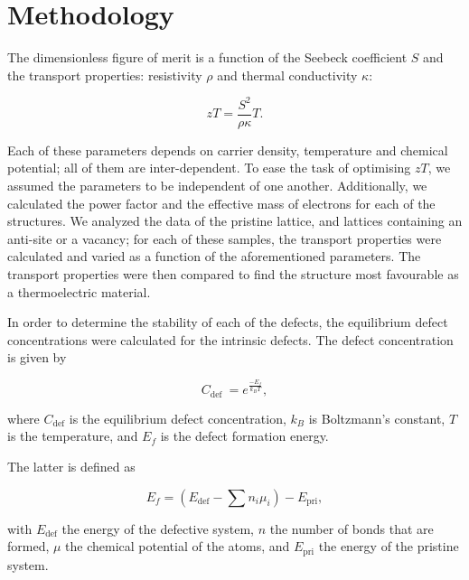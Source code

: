 \documentclass[12pt]{article}
\theoremstyle{plain}
\theoremstyle{definition}
\newcommand{\<}{\langle}
\renewcommand{\>}{\rangle}
\begin{document}
\section{Methodology}
The dimensionless figure of merit is a function of the Seebeck coefficient $S$ and the transport properties: resistivity $\rho$ and thermal conductivity $\kappa$: 

\begin{equation}
zT=\frac{S^2}{\rho \kappa} T.
\label{eq:ZT}
\end{equation}

Each of these parameters depends on carrier density, temperature and chemical potential; all of them are inter-dependent. 
To ease the task of optimising $zT$, we assumed the parameters to be independent of one another.
Additionally, we calculated the power factor and the effective mass of electrons for each of the structures.
We analyzed the data of the pristine lattice, and lattices containing an anti-site or a vacancy; for each of these samples, the transport properties were calculated and varied as a function of the aforementioned parameters. The transport properties were then compared to find the structure most favourable as a thermoelectric material. 

In order to determine the stability of each of the defects, the equilibrium defect concentrations were calculated for the intrinsic defects.
The defect concentration is given by


\begin{equation}
C_{\text {def }}=e^{\frac{-E_f}{k_B T}},
\label{eq:defectconcentration}
\end{equation}

where $C_{\text {def}}$ is the equilibrium defect concentration, $k_B$ is Boltzmann's constant, $T$ is the temperature, and $E_f$ is the defect formation energy.

The latter is defined as

\begin{equation}
E_f=\left(E_{\text {def}}-\sum n_i \mu_i\right)-E_{\text {pri}},
\label{eq:formationenergy}
\end{equation}

with $E_\text{def}$ the energy of the defective system, $n$ the number of bonds that are formed, $\mu$ the chemical potential of the atoms, and $E_{\text {pri}}$ the energy of the pristine system.
\end{document}
